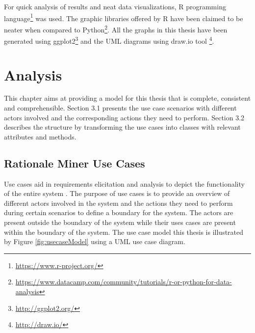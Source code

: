\documentclass[a4paper,12pt,twoside]{report}
\begin{document}
\newline \newline
For quick analysis of results and neat data visualizations, R programming language\footnote{\url{https://www.r-project.org/}} was used. The graphic libraries offered by R have been claimed to be neater when compared to Python\footnote{\url{https://www.datacamp.com/community/tutorials/r-or-python-for-data-analysis}}. All the graphs in this thesis have been generated using ggplot2\footnote{\url{http://ggplot2.org/}} and the UML diagrams using draw.io tool \footnote{\url{http://draw.io/}}.

\chapter{Analysis}
This chapter aims at providing a model for this thesis that is complete, consistent and comprehensible. Section 3.1 presents the use case scenarios with different actors involved and the corresponding actions they need to perform. Section 3.2 describes the structure by transforming the use cases into classes with relevant attributes and methods. 

\section{Rationale Miner Use Cases}
Use cases aid in requirements elicitation and analysis to depict the functionality of the entire system \cite{Bruegge2009}. The purpose of use cases is to provide an overview of different actors involved in the system and the actions they need to perform during certain scenarios to define a boundary for the system. The actors are present outside the boundary of the system while their uses cases are present within the boundary of the system. The use case model this thesis is illustrated by Figure \ref{fig:usecaseModel} using a UML use case diagram. 
\end{document}
